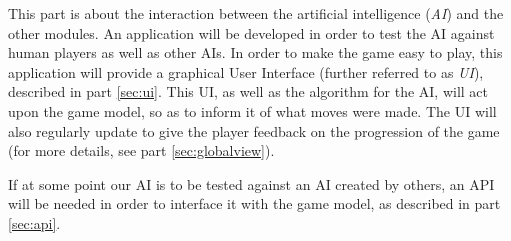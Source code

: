 This part is about the interaction between the artificial intelligence (\emph{AI}) and the other modules.
An application will be developed in order to test the AI against human players as well as other AIs.
In order to make the game easy to play, this application will provide a graphical User Interface (further referred to as \emph{UI}), described in part \ref{sec:ui}.
This UI, as well as the algorithm for the AI, will act upon the game model, so as to inform it of what moves were made.
The UI will also regularly update to give the player feedback on the progression of the game (for more details, see part \ref{sec:globalview}).

If at some point our AI is to be tested against an AI created by others, an API will be needed in order to interface it with the game model, as described in part \ref{sec:api}.

